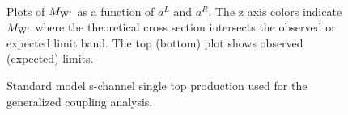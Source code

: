 \begin{figure}[htcb]
\begin{center}
\\
\caption{
Plots of $M_{\mathrm{W}^\prime}$ as a function of $a^L$ and $a^R$.  The z axis colors indicate $M_{\mathrm{W}^\prime}$ 
where the theoretical cross section intersects the observed or expected limit band.  The top (bottom) plot shows observed (expected) limits.
}
\label{figs:GCLim}
\end{center}
\end{figure}

\begin{figure}[htcb]
\begin{center}
\caption{
Standard model s-channel single top production used for the generalized coupling analysis.
}
\label{figs:ST}
\end{center}
\end{figure}

\clearpage
